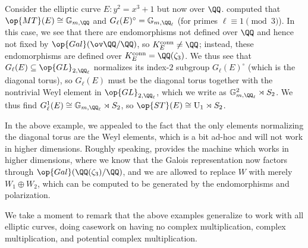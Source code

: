 \documentclass[../thesis.tex]{subfiles}
\begin{document}
\begin{example} \label{ex:pot-cm-ec-st}
	Consider the elliptic curve $E\colon y^2=x^3+1$ but now over $\QQ$.  computed that $\op{MT}(E)\cong\mathbb G_{m,\QQ}$ and $G_\ell(E)^\circ=\mathbb G_{m,\QQ_\ell}$ (for primes $\ell\equiv1\pmod3$). In this case, we see that there are endomorphisms not defined over $\QQ$ and hence not fixed by $\op{Gal}(\ov\QQ/\QQ)$, so $K_E^{\mathrm{conn}}\ne\QQ$; instead, these endomorphisms are defined over $K_E^{\mathrm{conn}}=\QQ(\zeta_3)$. We thus see that $G_\ell(E)\subseteq\op{GL}_{2,\QQ_\ell}$ normalizes its index-$2$ subgroup $G_\ell(E)^\circ$ (which is the diagonal torus), so $G_\ell(E)$ must be the diagonal torus together with the nontrivial Weyl element in $\op{GL}_{2,\QQ_\ell}$, which we write as $\mathbb G_{m,\QQ_\ell}^2\rtimes S_2$. We thus find $G_\ell^1(E)\cong\mathbb G_{m,\QQ_\ell}\rtimes S_2$, so $\op{ST}(E)\cong\mathrm U_1\rtimes S_2$.
\end{example}
\begin{remark}
	In the above example, we appealed to the fact that the only elements normalizing the diagonal torus are the Weyl elements, which is a bit ad-hoc and will not work in higher dimensions. Roughly speaking,  provides the machine which works in higher dimensions, where we know that the Galois representation now factors through $\op{Gal}(\QQ(\zeta_3)/\QQ)$, and we are allowed to replace $W$ with merely $W_1\oplus W_2$, which can be computed to be generated by the endomorphisms and polarization.
\end{remark}
We take a moment to remark that the above examples generalize to work with all elliptic curves, doing casework on having no complex multiplication, complex multiplication, and potential complex multiplication.
\end{document}
